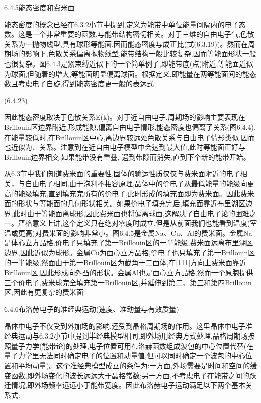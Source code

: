 6.4.5能态密度和费米面

能态密度的概念已经在6.3.2小节中提到,定义为能带中单位能量间隔内的电子态数。这是一个非常重要的函数,与能带结构密切相关。对于三维的自由电子气,色散关系为一抛物线型,具有球形等能面,因而能态密度与成正比(式(6.3.19))。然而在周期场的影响下,色散关系偏离抛物线型,能带结构一般比较复杂,因而等能面形状一般也很复杂。图6.4.3是紧束缚近似下的一个简单例子,即能带底(点)附近,等能面近似为球面,但随着的增大,等能面明显偏离球面。根据定义,即能量在两等能面间的能态数且考虑电子自旋,得到能态密度更一般的表达式

 	(6.4.23)



因此能态密度取决于色散关系E(k)。对于近自由电子,周期场的影响主要表现在Brillouin区边界附近,形成能隙,偏离自由电子情形,能态密度也偏离了关系(图6.4.4),在能量较低时,在Brillouin区中心,离边界较远处色散关系与自由电子情形类似,因而也近似为、关系。注意到在近自由电子模型中会达到最大值,此时等能面正好与Brillouin边界相交;如果能带没有重叠, 遇到带隙而消失,直到下个新的能带开始。

从6.3节中我们知道费米面的重要性,固体的输运性质仅仅与费米面附近的电子相关，与自由电子相同,由于泡利不相容原理,品体中的价电子从最低能量的能级向更高的能级填充,直到填充完所有的价电子,此时形成的填充面即为费米面。因此费米面的形状与等能面的几何形状相关。如果价电子填充完后,填充面靠近布里湖区边界,此时由于等能面离球形,因此费米面也将偏离球面,这解决了自由电子论的困难之一。严格意义上讲,这个定义只在绝对零度时成立,但是从前面我们也能看到温度(室温或更高)对费米面的影响非常小。图6.4.5是金属Na、Cu、Al的费米面。金属Na是体心立方品格,价电子只填充了第一Brillouin区的一半能级,费米面远离布里湖区边界,因此近似为球形。金属Cu为面心立方品格,价电子也只填充了第一Brillouin区的一半能级,然面由于第一Brillouin区为截角十二面体,在[111]方向上费米面靠近Brillouin区,因此形成向外凸的形状。金属Al也是面心立方品格,然而一个原胞提供三个价电子,费米球完全填充第一Brillouin区,并延伸到第二、第三和第四Brillouin区,因此有更复杂的费米面



6.4.6布洛赫电子的准经典运动(速度、准动量与有效质量)

晶体中电子不仅受到外加场的影响,还受到晶格周期场的作用。这里晶体中电子准经典运动与6.3.2小节中提到半经典模型相同,即外场用经典方式处理,晶格周期场按照量子力学(能带论)的处理,电子位置可用布洛赫函数组成波包的中心位置代替(在量子力学里无法同时确定电子的位置和动量值,但可以同时确定一个波包的中心位置和平均动量)。这个准经典模型成立的条件为:一方面,外场需要是时间和空间的缓变函数,即外场变化的波长远远大于晶格常数;另一方面,不考虑电子在能带之间的跃迁情况,即外场频率远远小于能带宽度。因此布洛赫电子运动满足以下两个基本关系式:

